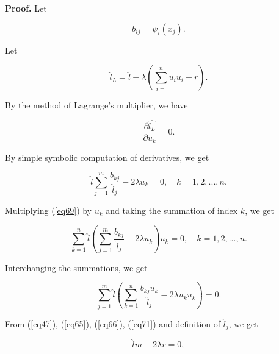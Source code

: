 \documentclass [18pt]{article}
\begin{document}
\textbf{Proof. }Let


\begin{equation}
\label{eq66}
b_{ij} = \psi _i (x_j ).
\end{equation}



Let


\begin{equation}
\label{eq67}
\widehat{l}_L = \widehat{l} - \lambda (\sum\limits_{i = }^n {u_i u_i } -
r).
\end{equation}



By the method of Lagrange's multiplier, we have


\begin{equation}
\label{eq68}
\frac{\partial \widehat{l_L }}{\partial u_k } = 0.
\end{equation}



By simple symbolic computation of derivatives, we get


\begin{equation}
\label{eq69}
\widehat{l}\sum\limits_{j = 1}^m {\frac{b_{kj} }{\widehat{l}_j }} - 2\lambda
u_k = 0,
\quad
k = 1,2,...,n.
\end{equation}



Multiplying (\ref{eq69}) by $u_k $ and taking the summation of index $k$, we get


\begin{equation}
\label{eq70}
\sum\limits_{k = 1}^n {\widehat{l}(\sum\limits_{j = 1}^m {\frac{b_{kj}
}{\widehat{l}_j }} - 2\lambda u_k )u_k } = 0,
\quad
k = 1,2,...,n.
\end{equation}



Interchanging the summations, we get


\begin{equation}
\label{eq71}
\sum\limits_{j = 1}^m {\widehat{l}(\sum\limits_{k = 1}^n {\frac{b_{kj} u_k
}{\widehat{l}_j }} - 2\lambda u_k u_k )} = 0.
\end{equation}



From (\ref{eq47}), (\ref{eq65}), (\ref{eq66}), (\ref{eq71}) and definition of $\widehat{l}_j $, we get


\begin{equation}
\label{eq72}
\widehat{l}m - 2\lambda r = 0,
\end{equation}
\end{document}
